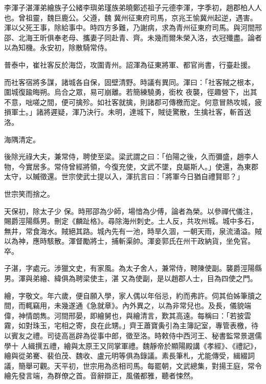 
\begin{pinyinscope}

 李渾子湛渾弟繪族子公緒李璵弟瑾族弟曉鄭述祖子元德李渾，字季初，趙郡柏人人也。曾祖靈，魏巨鹿公。父遵，魏
 冀州征東府司馬，京兆王愉冀州起逆，遇害。渾以父死王事，除給事中。時四方多難，乃謝病，求為青州征東府司馬。與河間邢邵、北海王昕俱奉老母、攜妻子同赴青、齊。未幾而爾朱榮入洛，衣冠殲盡。論者以為知機。永安初，除散騎常侍。



 普泰中，崔社客反於海岱，攻圍青州。詔渾為征東將軍、都官尚書，行臺赴援。



 而社客宿將多謀，諸城各自保，固壁清野。時議有異同。渾曰：「社客賊之根本，圍城復踰晦朔。烏合之眾，易可崩離。若簡練驍勇，銜枚
 夜襲，徑趣營下，出其不意，咄嗟之間，便可擒殄。如社客就擒，則諸郡可傳檄而定。何意冒熱攻城，疲損軍士。」諸將遲疑，渾乃決行。未明，達城下，賊徒驚散，生擒社客，斬首送洛。



 海隅清定。



 後除光祿大夫，兼常侍，聘使至梁。梁武謂之曰：「伯陽之後，久而彌盛，趙李人物，今實居多。常侍曾經將領，今復充使，文武不墜，良屬斯人。」使還，為東郡太守，以贓徵還。世宗使武士提以入，渾抗言曰：「將軍今日猶自禮賢耶？」



 世宗笑而捨之。



 天保初，除太子少
 保。時邢邵為少師，場愔為少傅，論者為榮。以參禪代儀注，賜爵涇陽縣男。刪定《麟趾格》。尋除海州刺史。土人反，共攻州城。城中多石，無井，常食海水。賊絕其路。城內先有一池，時旱久涸，一朝天雨，泉流涌溢。賊以為神，應時駭散。渾督勵將士，捕斬渠帥。渾妾郭氏在州干政納貨，坐免官。卒。



 子湛，字處元。涉獵文史，有家風。為太子舍人，兼常侍，聘陳使副。襲爵涇陽縣男。渾與弟繪、緯俱為聘梁使主，湛
 又為使副，是以趙郡人士，目為四使之門。



 繪，字敬文。年六歲，便自願入學，家人偶以年俗忌，約而弗許。伺其伯姊筆牘之間，而輒竊用，未幾遂通《急就章》。內外異之，以為非常兒也。及長，儀貌端偉，神情朗雋。河間邢晏，即繪舅也，與繪清言，歎其高遠。每稱曰：「若披雲霧，如對珠玉，宅相之寄，良在此甥。」齊王蕭寶夤引為主簿記室，專管表檄，待以賓友之禮。司徒高邕辟為從事中郎，徵至洛。時敕侍中西河王、秘書監常景選儒學十
 人緝撰五禮，繪與太原王又同掌軍禮。魏靜帝於顯陽殿講《孝經》、《禮記》，繪與從弟騫、裴伯茂、魏收、盧元明等俱為錄議。素長筆札，尤能傳受，緝綴詞議，簡舉可觀。天平初，世宗用為丞相司馬。每罷朝，文武總集，對揚王庭，常令繪先發言端，為群僚之首。音辭辯正，風儀都雅，聽者悚然。




\end{pinyinscope}
